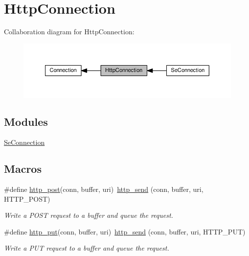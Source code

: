 \hypertarget{group__http__connection}{}\section{Http\+Connection}
\label{group__http__connection}
Collaboration diagram for Http\+Connection\+:\nopagebreak
\begin{figure}[H]
\begin{center}
\leavevmode
\includegraphics[width=350pt]{group__http__connection}
\end{center}
\end{figure}
\subsection*{Modules}
\begin{DoxyCompactItemize}
\item 
\hyperlink{group__se__connection}{Se\+Connection}
\end{DoxyCompactItemize}
\subsection*{Macros}
\begin{DoxyCompactItemize}
\item 
\#define \hyperlink{group__http__connection_ga4242e44b555e915d598838a9b78ddbdf}{http\+\_\+post}(conn,  buffer,  uri)~\hyperlink{group__http__connection_ga9d3a703c0cf3b053e915eaec5b394c28}{http\+\_\+send} (conn, buffer, uri, H\+T\+T\+P\+\_\+\+P\+O\+ST)
\begin{DoxyCompactList}\small\item\em Write a P\+O\+ST request to a buffer and queue the request. \end{DoxyCompactList}\item 
\#define \hyperlink{group__http__connection_gae0780a5dd17b70dee776f2cf9a91a242}{http\+\_\+put}(conn,  buffer,  uri)~\hyperlink{group__http__connection_ga9d3a703c0cf3b053e915eaec5b394c28}{http\+\_\+send} (conn, buffer, uri, H\+T\+T\+P\+\_\+\+P\+UT)
\begin{DoxyCompactList}\small\item\em Write a P\+UT request to a buffer and queue the request. \end{DoxyCompactList}\end{DoxyCompactItemize}
